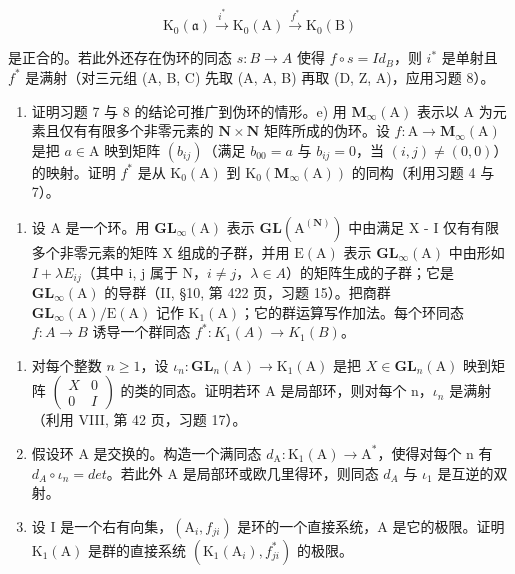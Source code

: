 \[
\mathrm{K} _ {0} (\mathfrak {a}) \xrightarrow {i ^ {*}} \mathrm{K} _ {0} (\mathrm{A}) \xrightarrow {f ^ {*}} \mathrm{K} _ {0} (\mathrm{B})
\]

是正合的。若此外还存在伪环的同态 \(s: B \to A\) 使得 \(f \circ s = Id_{B}\)，则 \(i^{*}\) 是单射且 \(f^{*}\) 是满射（对三元组 (A, B, C) 先取 (A, A, B) 再取 (D, Z, A)，应用习题 8）。

\begin{enumerate}
\def\labelenumi{\alph{enumi})}
\setcounter{enumi}{3}
\tightlist
\item
  证明习题 7 与 8 的结论可推广到伪环的情形。e) 用 \(\mathbf{M}_{\infty}(\mathrm{A})\) 表示以 A 为元素且仅有有限多个非零元素的 \(\mathbf{N} \times \mathbf{N}\) 矩阵所成的伪环。设 \(f: \mathrm{A} \to \mathbf{M}_{\infty}(\mathrm{A})\) 是把 \(a \in \mathrm{A}\) 映到矩阵 \((b_{ij})\)（满足 \(b_{00} = a\) 与 \(b_{ij} = 0\)，当 \((i,j) \neq (0,0)\)）的映射。证明 \(f^{*}\) 是从 \(\mathrm{K}_0(\mathrm{A})\) 到 \(\mathrm{K}_0(\mathbf{M}_{\infty}(\mathrm{A}))\) 的同构（利用习题 4 与 7）。
\end{enumerate}

\begin{enumerate}
\def\labelenumi{\arabic{enumi})}
\setcounter{enumi}{9}
\tightlist
\item
  设 A 是一个环。用 \(\mathbf{GL}_{\infty}(\mathrm{A})\) 表示 \(\mathbf{GL}(\mathrm{A}^{(\mathbf{N})})\) 中由满足 X - I 仅有有限多个非零元素的矩阵 X 组成的子群，并用 \(\mathrm{E}(\mathrm{A})\) 表示 \(\mathbf{GL}_{\infty}(\mathrm{A})\) 中由形如 \(I + \lambda E_{ij}\)（其中 i, j 属于 N，\(i \neq j\)，\(\lambda \in A\)）的矩阵生成的子群；它是 \(\mathbf{GL}_{\infty}(\mathrm{A})\) 的导群（II, §10, 第 422 页，习题 15）。把商群 \(\mathbf{GL}_{\infty}(\mathrm{A}) / \mathrm{E}(\mathrm{A})\) 记作 \(\mathrm{K}_{1}(\mathrm{A})\)；它的群运算写作加法。每个环同态 \(f : A \to B\) 诱导一个群同态 \(f^{*} : K_{1}(A) \to K_{1}(B)\)。
\end{enumerate}

\begin{enumerate}
\def\labelenumi{\alph{enumi})}
\item
  对每个整数 \(n \geqslant 1\)，设 \(\iota_{n} : \mathbf{GL}_{n}(\mathrm{A}) \to \mathrm{K}_{1}(\mathrm{A})\) 是把 \(X \in \mathbf{GL}_{n}(\mathrm{A})\) 映到矩阵 \(\begin{pmatrix} X & 0 \\ 0 & I \end{pmatrix}\) 的类的同态。证明若环 A 是局部环，则对每个 n，\(\iota_{n}\) 是满射（利用 VIII, 第 42 页，习题 17）。
\item
  假设环 A 是交换的。构造一个满同态 \(d_{\mathrm{A}} : \mathrm{K}_{1}(\mathrm{A}) \to \mathrm{A}^{*}\)，使得对每个 n 有 \(d_{A} \circ \iota_{n} = det\)。若此外 A 是局部环或欧几里得环，则同态 \(d_{A}\) 与 \(\iota_{1}\) 是互逆的双射。
\item
  设 I 是一个右有向集，\((\mathrm{A}_{i}, f_{ji})\) 是环的一个直接系统，A 是它的极限。证明 \(\mathrm{K}_{1}(\mathrm{A})\) 是群的直接系统 \((\mathrm{K}_{1}(\mathrm{A}_{i}), f_{ji}^{*})\) 的极限。
\end{enumerate}

